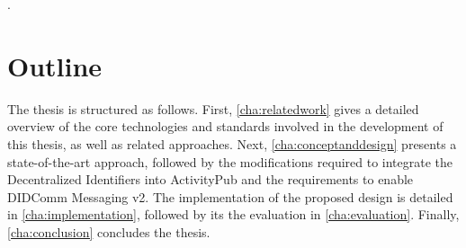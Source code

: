 .
\section{Outline}
The thesis is structured as follows. First, \autoref{cha:relatedwork} gives a detailed overview of the core technologies and standards involved in the development of this thesis, as well as related approaches. Next, \autoref{cha:conceptanddesign} presents a state-of-the-art approach, followed by the modifications required to integrate the Decentralized Identifiers into ActivityPub and the requirements to enable DIDComm Messaging v2. The implementation of the proposed design is detailed in \autoref{cha:implementation}, followed by its the evaluation in \autoref{cha:evaluation}. Finally, \autoref{cha:conclusion} concludes the thesis. 

